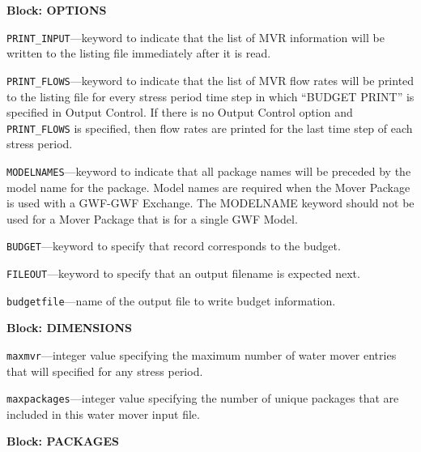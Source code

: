 
\item \textbf{Block: OPTIONS}

\begin{description}
\item \texttt{PRINT\_INPUT}---keyword to indicate that the list of MVR information will be written to the listing file immediately after it is read.

\item \texttt{PRINT\_FLOWS}---keyword to indicate that the list of MVR flow rates will be printed to the listing file for every stress period time step in which ``BUDGET PRINT'' is specified in Output Control.  If there is no Output Control option and \texttt{PRINT\_FLOWS} is specified, then flow rates are printed for the last time step of each stress period.

\item \texttt{MODELNAMES}---keyword to indicate that all package names will be preceded by the model name for the package.  Model names are required when the Mover Package is used with a GWF-GWF Exchange.  The MODELNAME keyword should not be used for a Mover Package that is for a single GWF Model.

\item \texttt{BUDGET}---keyword to specify that record corresponds to the budget.

\item \texttt{FILEOUT}---keyword to specify that an output filename is expected next.

\item \texttt{budgetfile}---name of the output file to write budget information.

\end{description}
\item \textbf{Block: DIMENSIONS}

\begin{description}
\item \texttt{maxmvr}---integer value specifying the maximum number of water mover entries that will specified for any stress period.

\item \texttt{maxpackages}---integer value specifying the number of unique packages that are included in this water mover input file.

\end{description}
\item \textbf{Block: PACKAGES}

